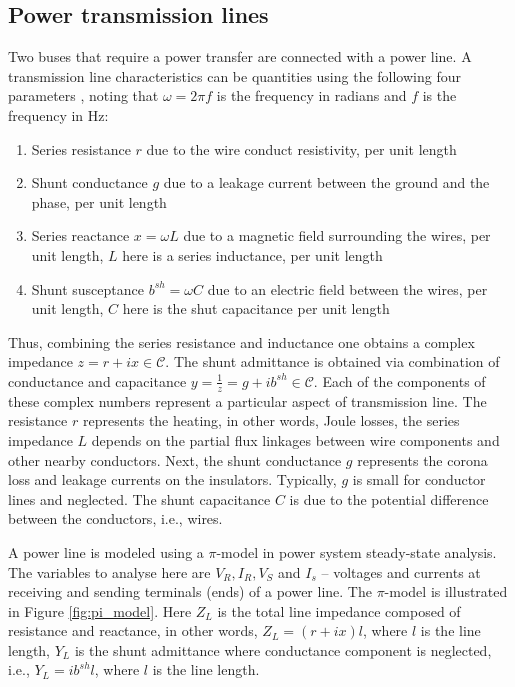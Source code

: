 \subsection{Power transmission lines}
Two buses that require a power transfer are connected with a power line. A transmission line characteristics can be quantities using the following four parameters \cite{machowski2020power}, noting that $\omega = 2 \pi f$ is the frequency in radians and $f$ is the frequency in Hz:
\begin{enumerate}
    \item Series resistance $r$ due to the wire conduct resistivity, per unit length
    \item Shunt conductance $g$ due to a leakage current between the ground and the phase, per unit length 
    \item Series reactance $x=\omega L$ due to a magnetic field surrounding the wires, per unit length, $L$ here is a series inductance, per unit length 
    \item Shunt susceptance $b^{sh}=\omega C$ due to an electric field between the wires, per unit length, $C$ here is the shut capacitance per unit length
\end{enumerate}

Thus, combining the series resistance and inductance one obtains a complex impedance $z = r + i x \in \mathcal{C}$. The shunt admittance is obtained via combination of conductance and capacitance $y = \frac{1}{z} = g + i b^{sh} \in \mathcal{C}$. Each of the components of these complex numbers represent a particular aspect of transmission line. The resistance $r$ represents the heating, in other words, Joule losses, the series impedance $L$ depends on the partial flux linkages between wire components and other nearby conductors. Next, the shunt conductance $g$ represents the corona loss and leakage currents on the insulators. Typically, $g$ is small for conductor lines and neglected. The shunt capacitance $C$ is due to the potential difference between the conductors, i.e., wires.

A power line is modeled using a $\pi$-model in power system steady-state analysis. The variables to analyse here are $V_R, I_R, V_S$ and $I_s$ -- voltages and currents at receiving and sending terminals (ends) of a power line. The $\pi$-model is illustrated in Figure \ref{fig:pi_model}. Here $Z_L$ is the total line impedance composed of resistance and reactance, in other words, $Z_L = (r + i x)l$, where $l$ is the line length, $Y_L$ is the shunt admittance where conductance component is neglected, i.e., $Y_L =i b^{sh} l$, where $l$ is the line length.


